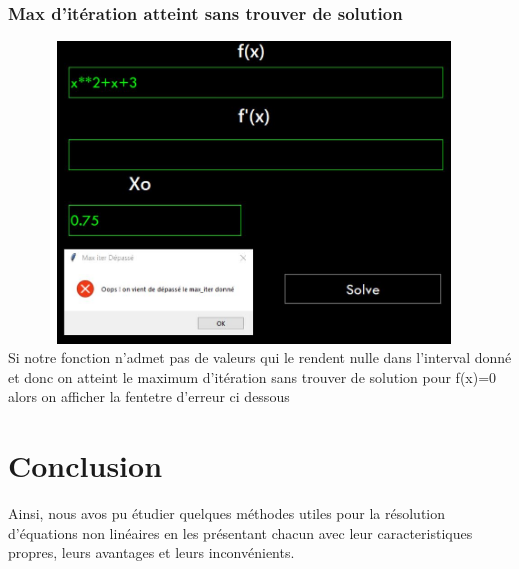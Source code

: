 \documentclass{article}
\begin{document}
\subsubsection{Max d'itération atteint sans trouver de solution}
\includegraphics[width=13cm,height=8cm]{img/validation/err_max.JPG}\\

Si notre fonction n'admet pas de valeurs qui le rendent nulle dans l'interval donné et donc on atteint le maximum d'itération sans trouver de solution pour f(x)=0 alors on afficher la fentetre d'erreur ci dessous


\newpage

\section{Conclusion}
    Ainsi, nous avos pu étudier quelques méthodes utiles pour la résolution d'équations non linéaires en les présentant chacun avec leur caracteristiques propres, leurs avantages et leurs inconvénients.
    
\end{document}
